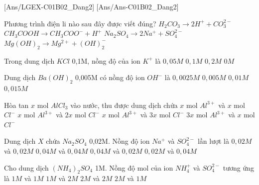%
[Ans/LGEX-C01B02_Dang2]
[Ans/Ans-C01B02_Dang2]
\begin{ex}
	Phương trình điện li nào sau đây được viết đúng?
	\choice
	{$H_2CO_3 \rightarrow 2H^+ + CO_3^{2-}$}
	{$CH_3COOH \rightarrow CH_3COO^- + H^+$}
	{\True $Na_2SO_4 \rightarrow 2Na^+ + SO_4^{2-}$}
	{$Mg(OH)_2 \rightarrow Mg^{2+} + (OH)_2^-$}
\end{ex}
\begin{ex}
	Trong dung dịch $KCl$ 0,1M, nồng độ của ion $K^+$ là
	\choice
	{$0,05 M$}
	{\True $0,1 M$}
	{$0,2 M$}
	{$0 M$}
\end{ex}
\begin{ex}
	Dung dịch $Ba(OH)_2$ 0,005M có nồng độ ion $OH^-$ là
	\choice
	{$0,0025 M$}
	{$0,005 M$}
	{\True $0,01 M$}
	{$0,015 M$}
\end{ex}
\begin{ex}
	Hòa tan $x$ mol $AlCl_3$ vào nước, thu được dung dịch chứa
	\choice
	{$x$ mol $Al^{3+}$ và $x$ mol $Cl^-$}
	{$x$ mol $Al^{3+}$ và $2x$ mol $Cl^-$}
	{\True $x$ mol $Al^{3+}$ và $3x$ mol $Cl^-$}
	{$3x$ mol $Al^{3+}$ và $x$ mol $Cl^-$}
\end{ex}
\begin{ex}
	Dung dịch $X$ chứa $Na_2SO_4$ 0,02M. Nồng độ ion $Na^+$ và $SO_4^{2-}$ lần lượt là
	\choice
	{$0,02M$ và $0,02M$}
	{$0,04M$ và $0,04M$}
	{\True $0,04M$ và $0,02M$}
	{$0,02M$ và $0,04M$}
\end{ex}
\begin{ex}
	Cho dung dịch $(NH_4)_2SO_4$ 1M. Nồng độ mol của ion $NH_4^+$ và $SO_4^{2-}$ tương ứng là
	\choice
	{$1M$ và $1M$}
	{$1M$ và $2M$}
	{$2M$ và $2M$}
	{\True $2M$ và $1M$}
\end{ex}
